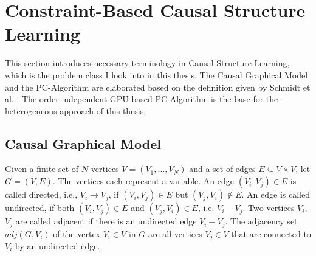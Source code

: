 \section{Constraint-Based Causal Structure Learning}
This section introduces necessary terminology in Causal Structure Learning, which is the problem class I look into in this thesis. The Causal Graphical Model and the PC-Algorithm are elaborated based on the definition given by Schmidt et al. \cite{schmidtOrderIndependentConstraintBasedCausal2018}. The order-independent GPU-based PC-Algorithm is the base for the heterogeneous approach of this thesis.

\subsection{Causal Graphical Model}
Given a finite set of $N$ vertices $V = (V_1,...,V_N)$ and a set of edges $E \subseteq V \times V$, let $G = (V,E)$. The vertices each represent a variable. An edge $(V_i, V_j) \in E$ is called directed, i.e., $V_i \rightarrow V_j$, if $(V_i,V_j) \in E$ but $(V_j, V_i) \notin E$. An edge is called undirected, if both $(V_i,V_j) \in E$ and $(V_j, V_i) \in E$, i.e. $V_i - V_j$. Two vertices $V_i$, $V_j$ are called adjacent if there is an undirected edge $V_i - V_j$. The adjacency set $adj(G, V_i)$ of the vertex $V_i \in V$ in $G$ are all vertices $V_j \in V$ that are connected to $V_i$ by an undirected edge.

